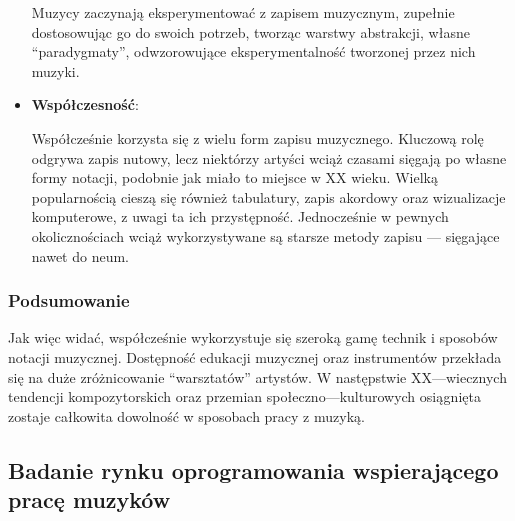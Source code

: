\begin{itemize}
	      Muzycy zaczynają eksperymentować z zapisem muzycznym, zupełnie dostosowując go do swoich potrzeb, tworząc warstwy abstrakcji,
	      własne \enquote{paradygmaty}, odwzorowujące eksperymentalność tworzonej przez nich muzyki.
	\item \textbf{Współczesność}:

	      Współcześnie korzysta się z wielu form zapisu muzycznego. Kluczową rolę odgrywa zapis nutowy,
	      lecz niektórzy artyści wciąż czasami sięgają po własne formy notacji, podobnie jak miało to miejsce w XX wieku.
	      Wielką popularnością cieszą się również tabulatury, zapis akordowy oraz wizualizacje komputerowe, z uwagi ta ich przystępność.
	      Jednocześnie w pewnych okolicznościach wciąż wykorzystywane są starsze metody zapisu — sięgające nawet do neum.
\end{itemize}

\subsubsection{Podsumowanie}
Jak więc widać, współcześnie wykorzystuje się szeroką gamę technik i sposobów notacji muzycznej. Dostępność edukacji muzycznej
oraz instrumentów przekłada się na duże zróżnicowanie \enquote{warsztatów} artystów. W następstwie XX—wiecznych tendencji kompozytorskich
oraz przemian społeczno—kulturowych osiągnięta zostaje całkowita dowolność w sposobach pracy z muzyką.

\subsection{Badanie rynku oprogramowania wspierającego pracę muzyków}
